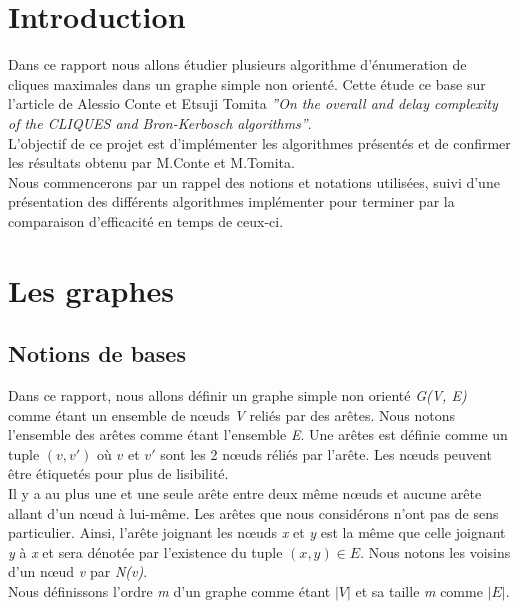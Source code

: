 \documentclass[a4paper, 12pt]{article}
\begin{document}
\tableofcontents

\newpage

\section{Introduction}

Dans ce rapport nous allons étudier plusieurs algorithme d'énumeration de cliques maximales dans un graphe simple non orienté. Cette étude ce base sur l'article de Alessio Conte et Etsuji Tomita  \textit{''On the overall and delay complexity of the CLIQUES and Bron-Kerbosch algorithms''}. \\
L'objectif de ce projet est d'implémenter les algorithmes présentés et de confirmer les résultats obtenu par M.Conte et M.Tomita. \\

Nous commencerons par un rappel des notions et notations utilisées, suivi d'une présentation des différents algorithmes implémenter pour terminer par la comparaison d'efficacité en temps de ceux-ci.

\section{Les graphes}%
\label{sec:graphes}

\subsection{Notions de bases}

Dans ce rapport, nous allons définir un graphe simple non orienté \emph{G(V, E)} comme étant un ensemble de nœuds \emph{V} reliés par des arêtes. Nous notons l'ensemble des arêtes comme étant l'ensemble \emph{E}. Une arêtes est définie comme un tuple $ (v, v') $ où $ v $ et $ v' $ sont les 2 nœuds réliés par l'arête. Les nœuds peuvent être étiquetés pour plus de lisibilité. \\

Il y a au plus une et une seule arête entre deux même nœuds et aucune arête allant d'un nœud à lui-même. Les arêtes que nous considérons n'ont pas de sens particulier. Ainsi, l'arête joignant les nœuds \emph{x} et \emph{y} est la même que celle joignant \emph{y} à \emph{x} et sera dénotée par l'existence du tuple $(x, y) \in E$.
Nous notons les voisins d'un nœud \emph{v} par \emph{N(v)}.\\ 

Nous définissons l'ordre \emph{m} d'un graphe comme étant $ |V| $ et sa taille \emph{m} comme $ |E| $. \\
\end{document}
